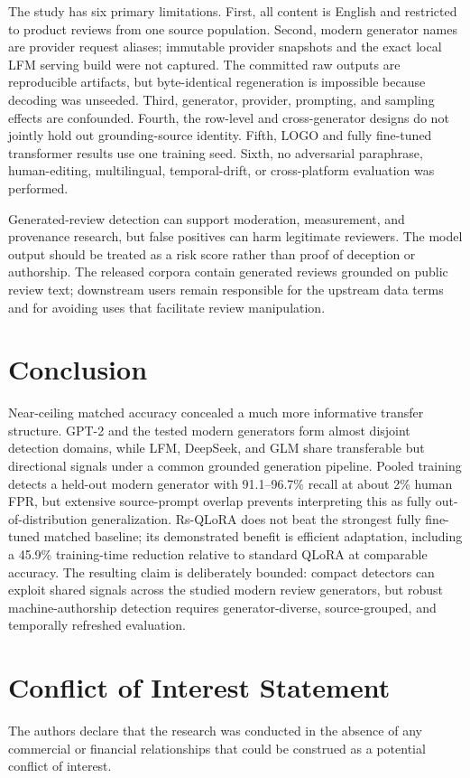 \documentclass[utf8]{FrontiersinHarvard}
\begin{document}
The study has six primary limitations. First, all content is English and restricted to product reviews from one source population. Second, modern generator names are provider request aliases; immutable provider snapshots and the exact local LFM serving build were not captured. The committed raw outputs are reproducible artifacts, but byte-identical regeneration is impossible because decoding was unseeded. Third, generator, provider, prompting, and sampling effects are confounded. Fourth, the row-level and cross-generator designs do not jointly hold out grounding-source identity. Fifth, LOGO and fully fine-tuned transformer results use one training seed. Sixth, no adversarial paraphrase, human-editing, multilingual, temporal-drift, or cross-platform evaluation was performed.

Generated-review detection can support moderation, measurement, and provenance research, but false positives can harm legitimate reviewers. The model output should be treated as a risk score rather than proof of deception or authorship. The released corpora contain generated reviews grounded on public review text; downstream users remain responsible for the upstream data terms and for avoiding uses that facilitate review manipulation.

\section{Conclusion}

Near-ceiling matched accuracy concealed a much more informative transfer structure. GPT-2 and the tested modern generators form almost disjoint detection domains, while LFM, DeepSeek, and GLM share transferable but directional signals under a common grounded generation pipeline. Pooled training detects a held-out modern generator with 91.1--96.7\% recall at about 2\% human FPR, but extensive source-prompt overlap prevents interpreting this as fully out-of-distribution generalization. Rs-QLoRA does not beat the strongest fully fine-tuned matched baseline; its demonstrated benefit is efficient adaptation, including a 45.9\% training-time reduction relative to standard QLoRA at comparable accuracy. The resulting claim is deliberately bounded: compact detectors can exploit shared signals across the studied modern review generators, but robust machine-authorship detection requires generator-diverse, source-grouped, and temporally refreshed evaluation.

\section*{Conflict of Interest Statement}
The authors declare that the research was conducted in the absence of any commercial or financial relationships that could be construed as a potential conflict of interest.
\end{document}
